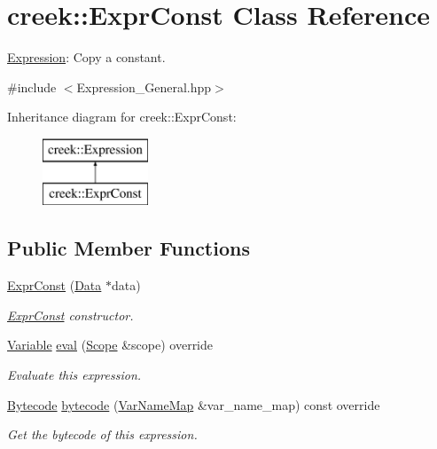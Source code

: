 \hypertarget{classcreek_1_1_expr_const}{}\section{creek\+:\+:Expr\+Const Class Reference}
\label{classcreek_1_1_expr_const}


\hyperlink{classcreek_1_1_expression}{Expression}\+: Copy a constant.  




{\ttfamily \#include $<$Expression\+\_\+\+General.\+hpp$>$}

Inheritance diagram for creek\+:\+:Expr\+Const\+:\begin{figure}[H]
\begin{center}
\leavevmode
\includegraphics[height=2.000000cm]{classcreek_1_1_expr_const}
\end{center}
\end{figure}
\subsection*{Public Member Functions}
\begin{DoxyCompactItemize}
\item 
\hyperlink{classcreek_1_1_expr_const_a2e4f5904e6ddeb6503d784f388a11811}{Expr\+Const} (\hyperlink{classcreek_1_1_data}{Data} $\ast$data)
\begin{DoxyCompactList}\small\item\em {\ttfamily \hyperlink{classcreek_1_1_expr_const}{Expr\+Const}} constructor. \end{DoxyCompactList}\item 
\hyperlink{classcreek_1_1_variable}{Variable} \hyperlink{classcreek_1_1_expr_const_ad5602ea2700ea4d6c1ce86457cb151a6}{eval} (\hyperlink{classcreek_1_1_scope}{Scope} \&scope) override
\begin{DoxyCompactList}\small\item\em Evaluate this expression. \end{DoxyCompactList}\item 
\hyperlink{classcreek_1_1_bytecode}{Bytecode} \hyperlink{classcreek_1_1_expr_const_a26905b2e83297405a47745a1edb4b85d}{bytecode} (\hyperlink{classcreek_1_1_var_name_map}{Var\+Name\+Map} \&var\+\_\+name\+\_\+map) const  override\hypertarget{classcreek_1_1_expr_const_a26905b2e83297405a47745a1edb4b85d}{}\label{classcreek_1_1_expr_const_a26905b2e83297405a47745a1edb4b85d}

\begin{DoxyCompactList}\small\item\em Get the bytecode of this expression. \end{DoxyCompactList}\end{DoxyCompactItemize}


